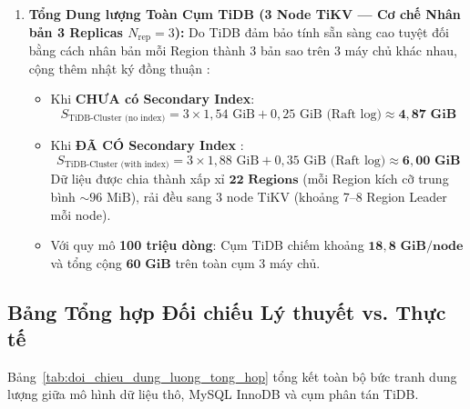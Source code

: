 \begin{enumerate}
  \item \textbf{Tổng Dung lượng Toàn Cụm TiDB (3 Node TiKV --- Cơ chế Nhân bản 3 Replicas $N_{\text{rep}} = 3$):}
  Do TiDB đảm bảo tính sẵn sàng cao tuyệt đối bằng cách nhân bản mỗi Region thành 3 bản sao trên 3 máy chủ khác nhau, cộng thêm nhật ký đồng thuận :
  \begin{itemize}
    \item Khi \textbf{CHƯA có Secondary Index}:
    \begin{equation}
      S_{\text{TiDB-Cluster (no index)}} = 3 \times 1,54\text{ GiB} + 0,25\text{ GiB (Raft log)} \approx \mathbf{4,87\text{ GiB}}
    \end{equation}
    \item Khi \textbf{ĐÃ CÓ Secondary Index }:
    \begin{equation}
      S_{\text{TiDB-Cluster (with index)}} = 3 \times 1,88\text{ GiB} + 0,35\text{ GiB (Raft log)} \approx \mathbf{6,00\text{ GiB}}
    \end{equation}
    Dữ liệu được chia thành xấp xỉ $\mathbf{22\text{ Regions}}$ (mỗi Region kích cỡ trung bình $\sim 96\text{ MiB}$), rải đều sang 3 node TiKV (khoảng 7--8 Region Leader mỗi node).
    \item Với quy mô \textbf{100 triệu dòng}: Cụm TiDB chiếm khoảng $\mathbf{18,8\text{ GiB/node}}$ và tổng cộng $\mathbf{60\text{ GiB}}$ trên toàn cụm 3 máy chủ.
  \end{itemize}
\end{enumerate}

\subsection{Bảng Tổng hợp Đối chiếu Lý thuyết vs. Thực tế}

Bảng~\ref{tab:doi_chieu_dung_luong_tong_hop} tổng kết toàn bộ bức tranh dung lượng giữa mô hình dữ liệu thô, MySQL InnoDB và cụm phân tán TiDB.

